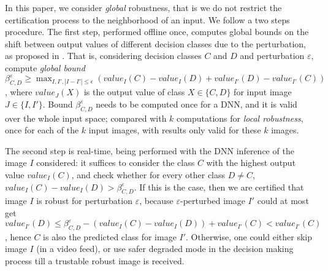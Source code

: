 In this paper, we consider {\em global} robustness, that is we do not restrict the certification process to the neighborhood of an input. We follow a two steps procedure. 
The first step, performed offline once, computes global bounds on the shift between 
output values of different decision classes due to the perturbation, as proposed in \cite{vhagar}. 
That is, considering decision classes $C$ and $D$ and perturbation $\varepsilon$, compute 
{\em global bound} $\beta^\varepsilon_{C,D} \geq \max_{I,I', |I-I'| \leq \epsilon}(value_{I}(C) - value_{I}(D) + value_{I'}(D) - value_{I'}(C))$, where $value_{J}(X)$ is the output value of class $X \in \{C,D\}$ for input image $J \in \{I,I'\}$. %
Bound $\beta^\varepsilon_{C,D}$ needs to be computed once for a DNN, 
and it is valid over the whole input space; compared with $k$ computations for {\em local robustness}, once for each of the $k$ input images, with results only valid for these $k$ images.

The second step is real-time, being performed with the DNN inference of the image $I$ considered: it suffices to consider the class $C$ with the highest output value $value_{I}(C)$, and check whether for every other class $D \neq C$, 
$value_{I}(C) - value_{I}(D) > \beta^\varepsilon_{C,D}$. 
If this is the case, then we are certified that image $I$ is robust for perturbation $\varepsilon$, because $\varepsilon$-perturbed image $I'$ could at most get  $value_{I'}(D) \leq \beta^\varepsilon_{C,D}  - (value_{I}(C) - value_{I}(D))  + value_{I'}(C) < value_{I'}(C)$, hence $C$ is also the predicted class for image $I'$. Otherwise, one could either skip image $I$ (in a video feed), or use safer degraded mode in the decision making process till a trustable robust image is received.


